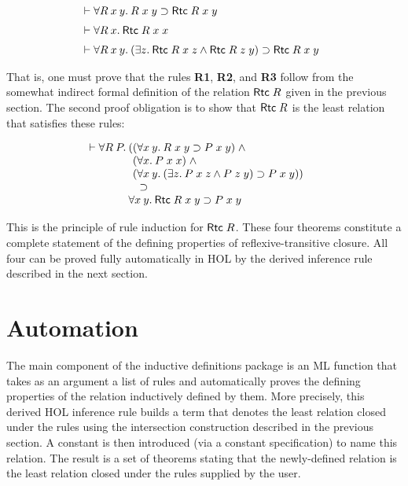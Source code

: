 \documentclass[twocolumn,fleqn,layout]{article}
\begin{document}
\[ \begin{array}[t]{@{}l}
   \vdash \forall R\:x\:y.\:R\;x\;y \supset {\sf Rtc}\;R\;x\;y \\[2mm]
   \vdash \forall R\:x.\:{\sf Rtc}\;R\;x\;x \\[2mm]
   \vdash \forall R\:x\:y.\:
        (\exists z.\:{\sf Rtc}\;R\;x\;z \wedge {\sf Rtc}\;R\;z\;y) \supset
        {\sf Rtc}\;R\;x\;y
\end{array}\]

\noindent That is, one must prove that the rules {{\small\bf R}\bf 1},
{{\small\bf R}\bf 2}, and {{\small\bf R}\bf 3} follow from the somewhat
indirect formal definition of the relation ${\sf Rtc}\;R$ given in the previous
section.  The second proof obligation is to show that ${\sf Rtc}\;R$ is the
least relation that satisfies these rules:

\[\vdash \begin{array}[t]{@{}l}
\forall R\:P.\:\begin{array}[t]{@{}l}
  (\begin{array}[t]{@{}l}
  (\forall x\:y.\:R\;x\;y \supset P\;x\;y)\; \wedge \\
  (\forall x.\:P\;x\;x)\; \wedge \\
  (\forall x\:y.\:(\exists z.\:P\;x\;z \wedge P\;z\;y)
    \supset P\;x\;y))\end{array}\\
\quad\supset\\
\forall x\:y.\: {\sf Rtc}\;R\;x\;y \supset P\;x\;y
\end{array}\end{array}\]

\noindent This is the principle of rule induction for ${\sf Rtc}\;R$.  These
four theorems constitute a complete statement of the defining properties of
reflexive-transitive closure. All four can be proved fully automatically in
{\small HOL} by the derived inference rule described in the next section.

\section{Automation}\label{newind}

The main component of the inductive definitions package is an {\small ML}
function that takes as an argument a list of rules and automatically proves the
defining properties of the \mbox{relation} inductively defined by them.  More
precisely, this derived {\small HOL} inference rule builds a term that denotes
the least relation closed under the rules using the intersection construction
described in the previous section.  A constant is then introduced (via a
constant specification) to name this relation.  The result is a set of theorems
stating that the newly-defined relation is the least relation closed under the
rules supplied by the user.
\end{document}
